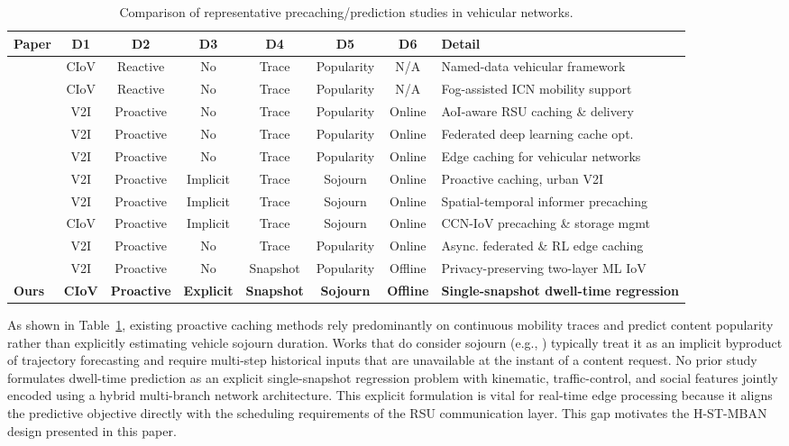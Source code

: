 \documentclass[journal]{IEEEtran}
\begin{document}
\begin{table}[!t]
\centering
\caption{Comparison of representative precaching/prediction studies in vehicular networks.}
\label{tab:related_work}
\begin{tabular}{@{}lccccccl@{}}
\toprule
\textbf{Paper} & \textbf{D1} & \textbf{D2} & \textbf{D3} & \textbf{D4} & \textbf{D5} & \textbf{D6} & \textbf{Detail} \\
\midrule
\cite{1}  & CIoV & Reactive  & No  & Trace    & Popularity & N/A     & Named-data vehicular framework \\
\cite{3}  & CIoV & Reactive  & No  & Trace    & Popularity & N/A     & Fog-assisted ICN mobility support \\
\cite{15} & V2I  & Proactive & No  & Trace    & Popularity & Online  & AoI-aware RSU caching \& delivery \\
\cite{17} & V2I  & Proactive & No  & Trace    & Popularity & Online  & Federated deep learning cache opt. \\
\cite{32} & V2I  & Proactive & No  & Trace    & Popularity & Online  & Edge caching for vehicular networks \\
\cite{39} & V2I  & Proactive & Implicit & Trace & Sojourn  & Online  & Proactive caching, urban V2I \\
\cite{42} & V2I  & Proactive & Implicit & Trace & Sojourn  & Online  & Spatial-temporal informer precaching \\
\cite{45} & CIoV & Proactive & Implicit & Trace & Sojourn  & Online  & CCN-IoV precaching \& storage mgmt \\
\cite{48} & V2I  & Proactive & No  & Trace    & Popularity & Online  & Async. federated \& RL edge caching \\
\cite{64} & V2I  & Proactive & No  & Snapshot & Popularity & Offline & Privacy-preserving two-layer ML IoV \\
\textbf{Ours} & \textbf{CIoV} & \textbf{Proactive} & \textbf{Explicit} & \textbf{Snapshot} & \textbf{Sojourn} & \textbf{Offline} & \textbf{Single-snapshot dwell-time regression} \\
\bottomrule
\end{tabular}
\end{table}

As shown in Table~\ref{tab:related_work}, existing proactive caching methods rely predominantly on continuous mobility traces and predict content popularity rather than explicitly estimating vehicle sojourn duration.
Works that do consider sojourn (e.g., \cite{39,42,45}) typically treat it as an implicit byproduct of trajectory forecasting and require multi-step historical inputs that are unavailable at the instant of a content request.
No prior study formulates dwell-time prediction as an explicit single-snapshot regression problem with kinematic, traffic-control, and social features jointly encoded using a hybrid multi-branch network architecture.
This explicit formulation is vital for real-time edge processing because it aligns the predictive objective directly with the scheduling requirements of the RSU communication layer.
This gap motivates the H-ST-MBAN design presented in this paper.
\end{document}
